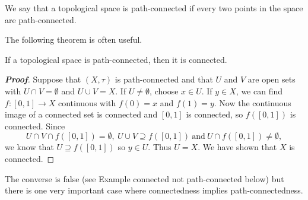 We say that a topological space is path-connected if every two
points in the space are path-connected.

The following theorem is often useful.


\begin{theorem}\label{T;path-connected to connected}
If a topological space is path-connected, then it is connected.
\end{theorem}
\begin{proof}[\bf Proof]
Suppose that $(X,\tau)$ is path-connected and
that $U$ and $V$ are
open sets with $U\cap V=\emptyset$ and $U\cup V=X$.
If $U\neq \emptyset$, choose $x\in U$.
If $y\in X$, we
can find $f:[0,1]\rightarrow X$ continuous with
$f(0)=x$ and $f(1)=y$. Now the continuous image of a connected set
is connected and $[0,1]$ is connected, so $f([0,1])$ is connected.
Since
\[U\cap V\cap f([0,1])=\emptyset,
\ U\cup V\supseteq f([0,1])
\ \text{and}\ U\cap f([0,1])\neq\emptyset,\]
we know that $U\supseteq f([0,1])$ so $y\in U$. Thus $U=X$.
We have shown that $X$ is connected.
\end{proof}

The converse is false (see Example connected not path-connected
below) but there is one very important case where connectedness
implies path-connectedness.



